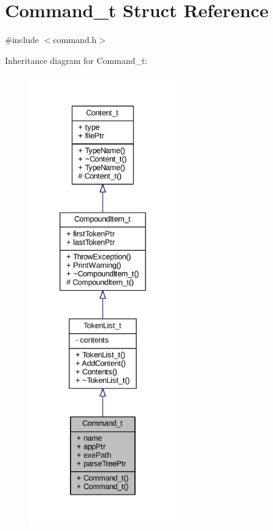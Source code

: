 \hypertarget{struct_command__t}{}\section{Command\+\_\+t Struct Reference}
\label{struct_command__t}


{\ttfamily \#include $<$command.\+h$>$}



Inheritance diagram for Command\+\_\+t\+:
\nopagebreak
\begin{figure}[H]
\begin{center}
\leavevmode
\includegraphics[height=550pt]{struct_command__t__inherit__graph}
\end{center}
\end{figure}


